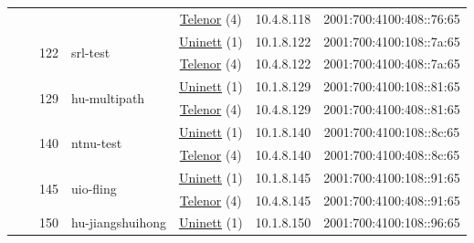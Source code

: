 \begin{small}
\begin{center}
\begin{longtable}{|c|c|c|c|c|c|c|c|}
  &  &  &  & \multicolumn{2}{|c|}{\tiny{\href{https://www.telenor.no}{Telenor} (4)}} & \tiny{10.4.8.118} & \tiny{2001:700:4100:408::76:65} \\* \cline{3-3}\cline{4-4}\cline{5-5}\cline{6-6}\cline{7-7}\cline{8-8}
  &  & \multirow{2}{*}{\tiny{122}} & \multicolumn{1}{|l|}{\multirow{2}{*}{\tiny{srl-test}}} & \multicolumn{2}{|c|}{\tiny{\href{https://www.uninett.no}{Uninett} (1)}} & \tiny{10.1.8.122} & \tiny{2001:700:4100:108::7a:65} \\* \cline{5-5}\cline{6-6}\cline{7-7}\cline{8-8}
  &  &  &  & \multicolumn{2}{|c|}{\tiny{\href{https://www.telenor.no}{Telenor} (4)}} & \tiny{10.4.8.122} & \tiny{2001:700:4100:408::7a:65} \\* \cline{3-3}\cline{4-4}\cline{5-5}\cline{6-6}\cline{7-7}\cline{8-8}
  &  & \multirow{2}{*}{\tiny{129}} & \multicolumn{1}{|l|}{\multirow{2}{*}{\tiny{hu-multipath}}} & \multicolumn{2}{|c|}{\tiny{\href{https://www.uninett.no}{Uninett} (1)}} & \tiny{10.1.8.129} & \tiny{2001:700:4100:108::81:65} \\* \cline{5-5}\cline{6-6}\cline{7-7}\cline{8-8}
  &  &  &  & \multicolumn{2}{|c|}{\tiny{\href{https://www.telenor.no}{Telenor} (4)}} & \tiny{10.4.8.129} & \tiny{2001:700:4100:408::81:65} \\* \cline{3-3}\cline{4-4}\cline{5-5}\cline{6-6}\cline{7-7}\cline{8-8}
  &  & \multirow{2}{*}{\tiny{140}} & \multicolumn{1}{|l|}{\multirow{2}{*}{\tiny{ntnu-test}}} & \multicolumn{2}{|c|}{\tiny{\href{https://www.uninett.no}{Uninett} (1)}} & \tiny{10.1.8.140} & \tiny{2001:700:4100:108::8c:65} \\* \cline{5-5}\cline{6-6}\cline{7-7}\cline{8-8}
  &  &  &  & \multicolumn{2}{|c|}{\tiny{\href{https://www.telenor.no}{Telenor} (4)}} & \tiny{10.4.8.140} & \tiny{2001:700:4100:408::8c:65} \\* \cline{3-3}\cline{4-4}\cline{5-5}\cline{6-6}\cline{7-7}\cline{8-8}
  &  & \multirow{2}{*}{\tiny{145}} & \multicolumn{1}{|l|}{\multirow{2}{*}{\tiny{uio-fling}}} & \multicolumn{2}{|c|}{\tiny{\href{https://www.uninett.no}{Uninett} (1)}} & \tiny{10.1.8.145} & \tiny{2001:700:4100:108::91:65} \\* \cline{5-5}\cline{6-6}\cline{7-7}\cline{8-8}
  &  &  &  & \multicolumn{2}{|c|}{\tiny{\href{https://www.telenor.no}{Telenor} (4)}} & \tiny{10.4.8.145} & \tiny{2001:700:4100:408::91:65} \\* \cline{3-3}\cline{4-4}\cline{5-5}\cline{6-6}\cline{7-7}\cline{8-8}
  &  & \multirow{2}{*}{\tiny{150}} & \multicolumn{1}{|l|}{\multirow{2}{*}{\tiny{hu-jiangshuihong}}} & \multicolumn{2}{|c|}{\tiny{\href{https://www.uninett.no}{Uninett} (1)}} & \tiny{10.1.8.150} & \tiny{2001:700:4100:108::96:65} \\* \cline{5-5}\cline{6-6}\cline{7-7}\cline{8-8}

\end{longtable}
\end{center}
\end{small}
